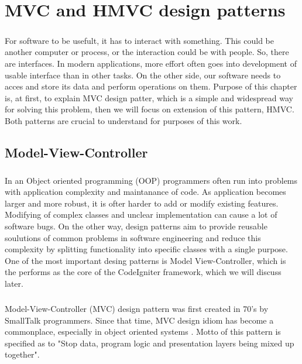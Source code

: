\chapter{MVC and HMVC design patterns}

\label{kap:courses} %

\paragraph{}
For software to be usefult, it has to interact with something. This could be another computer or process, or the interaction could be with people. So, there are interfaces. In modern applications, more effort often goes into development of usable interface than in other tasks. On the other side, our software needs to acces and store its data and perform operations on them. Purpose of this chapter is, at first, to explain MVC design patter, which is a simple and widespread way for solving this problem, then we will focus on extension of this pattern, HMVC. Both patterns are crucial to understand for purposes of this work.

\section{Model-View-Controller}
\paragraph{}
In an Object oriented programming (OOP) programmers often run into problems with application complexity and maintanance of code. As application becomes larger and more robust, it is ofter harder to add or modify existing features. Modifying of complex classes and unclear implementation can cause a lot of software bugs. On the other way, design patterns aim to provide reusable soulutions of common problems in software engineering and reduce this complexity by splitting functionality into specific classes with a single purpose. One of the most important desing patterns is Model View-Controller, which is the performs as the core of the CodeIgniter framework, which we will discuss later.

\paragraph{}
Model-View-Controller (MVC) design pattern was first created in 70’s by SmallTalk programmers. Since that time, MVC design idiom has become a commonplace, especially in object oriented systems \cite{deacon2009model}. Motto of this pattern is specified as to "Stop data, program logic and presentation layers being mixed up together".

